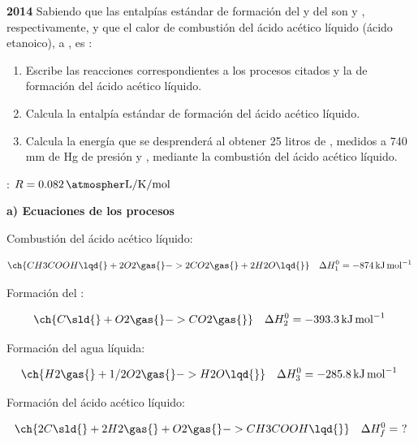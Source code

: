 \begin{exerciseEVAU}
    \textbf{2014} Sabiendo que las entalpías estándar de formación del  y del   son  y , respectivamente, y que el calor de combustión del ácido acético líquido (ácido etanoico), a , es :
    \begin{enumerate}[label=\letraminuscula]
    \item Escribe las reacciones correspondientes a los procesos citados y la de formación del ácido acético líquido.
    \item Calcula la entalpía estándar de formación del ácido acético líquido.
    \item Calcula la energía que se desprenderá al obtener 25 litros de , medidos a 740 mm de Hg de presión y , mediante la combustión del ácido acético líquido.
    \end{enumerate}
    \datos{}: \(R = \ctegases\)

    \begin{solu}

        \textbf{a) Ecuaciones de los procesos}

        Combustión del ácido acético líquido:

        \begin{equation*}
            \ch{CH3COOH \lqd{} + 2 O2 \gas{} -> 2 CO2 \gas{} + 2 H2O \lqd{}} \quad \Delta H^0_1 = \energia[kjmol]{-874}
        \end{equation*}

        Formación del :

        \begin{equation*}
            \ch{C \sld{} + O2 \gas{} -> CO2 \gas{}} \quad \Delta H^0_2 = \energia[kjmol]{-393.3}
        \end{equation*}

        Formación del agua líquida:

        \begin{equation*}
            \ch{H2 \gas{} + 1/2 O2 \gas{} -> H2O \lqd{}} \quad \Delta H^0_3 = \energia[kjmol]{-285.8}
        \end{equation*}

        Formación del ácido acético líquido:

        \begin{equation*}
            \ch{2 C \sld{} + 2 H2 \gas{} + O2 \gas{} -> CH3COOH \lqd{}} \quad \Delta H^0_f = \ ?
        \end{equation*}


\end{solu}
\end{exerciseEVAU}
